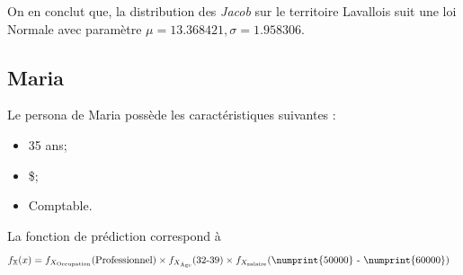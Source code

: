 \documentclass[11pt,french]{article}\usepackage[]{graphicx}\usepackage[]{color}
\begin{document}
On en conclut que, la distribution des \emph{Jacob} sur le territoire Lavallois suit une loi Normale avec paramètre $\mu = 13.368421, \sigma = 1.958306$.

\subsection*{Maria}
Le persona de Maria possède les caractéristiques suivantes : 
\begin{itemize}
\item 35 ans;
\item{} \$;
\item Comptable.
\end{itemize}
La fonction de prédiction correspond à
\begin{align*}
f_{\mathbb{X}}(x) &= f_{X_{\text{Occupation}}}(\text{Professionnel}) \times f_{X_{\text{Âge}}}(\text{32-39}) \times f_{X_{\text{salaire}}}(\text{\numprint{50000} - \numprint{60000}})
\end{align*}
\end{document}
